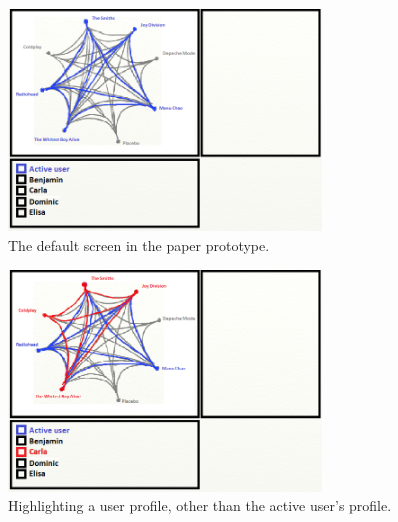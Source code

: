 \documentclass[a4paper,10pt,twocolumn]{article}
\begin{document}
\begin{figure}[!ht]
  \begin{center}
  	
    \includegraphics[width=8.3cm]{data/paperprototype1}
  \end{center}
  \caption{The default screen in the paper prototype.}
  \label{fig:paperprototype1}
\end{figure}

\begin{figure}[!ht]
  \begin{center}
  	
    \includegraphics[width=8.3cm]{data/paperprototype2}
  \end{center}
  \caption{Highlighting a user profile, other than the active user's profile.}
  \label{fig:paperprototype2}
\end{figure}
\end{document}
